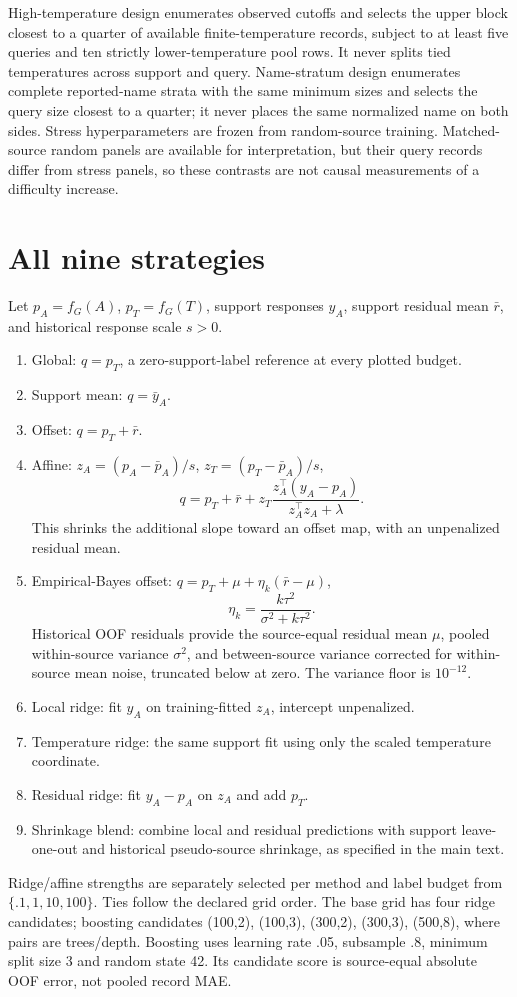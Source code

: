 \documentclass[11pt]{article}
\begin{document}
High-temperature design enumerates observed cutoffs and selects the upper block closest to a quarter of available finite-temperature records, subject to at least five queries and ten strictly lower-temperature pool rows. It never splits tied temperatures across support and query. Name-stratum design enumerates complete reported-name strata with the same minimum sizes and selects the query size closest to a quarter; it never places the same normalized name on both sides. Stress hyperparameters are frozen from random-source training. Matched-source random panels are available for interpretation, but their query records differ from stress panels, so these contrasts are not causal measurements of a difficulty increase.

\section{All nine strategies}
Let $p_A=f_G(A)$, $p_T=f_G(T)$, support responses $y_A$, support residual mean $\bar r$, and historical response scale $s>0$.
\begin{enumerate}
\item Global: $q=p_T$, a zero-support-label reference at every plotted budget.
\item Support mean: $q=\bar y_A$.
\item Offset: $q=p_T+\bar r$.
\item Affine: $z_A=(p_A-\bar p_A)/s$, $z_T=(p_T-\bar p_A)/s$,
\[q=p_T+\bar r+z_T\frac{z_A^\top(y_A-p_A)}{z_A^\top z_A+\lambda}.\]
This shrinks the additional slope toward an offset map, with an unpenalized residual mean.
\item Empirical-Bayes offset: $q=p_T+\mu+\eta_k(\bar r-\mu)$,
\[\eta_k=\frac{k\tau^2}{\sigma^2+k\tau^2}.\]
Historical OOF residuals provide the source-equal residual mean $\mu$, pooled within-source variance $\sigma^2$, and between-source variance corrected for within-source mean noise, truncated below at zero. The variance floor is $10^{-12}$.
\item Local ridge: fit $y_A$ on training-fitted $z_A$, intercept unpenalized.
\item Temperature ridge: the same support fit using only the scaled temperature coordinate.
\item Residual ridge: fit $y_A-p_A$ on $z_A$ and add $p_T$.
\item Shrinkage blend: combine local and residual predictions with support leave-one-out and historical pseudo-source shrinkage, as specified in the main text.
\end{enumerate}
Ridge/affine strengths are separately selected per method and label budget from $\{.1,1,10,100\}$. Ties follow the declared grid order. The base grid has four ridge candidates; boosting candidates (100,2), (100,3), (300,2), (300,3), (500,8), where pairs are trees/depth. Boosting uses learning rate .05, subsample .8, minimum split size 3 and random state 42. Its candidate score is source-equal absolute OOF error, not pooled record MAE.
\end{document}

